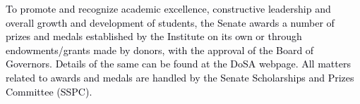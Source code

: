 \documentclass[12pt]{article}
\begin{document}
\vspace{\baselineskip}
\begin{justify}
{\fontsize{9pt}{10.8pt}\selectfont \textcolor[HTML]{00000A}{To promote and recognize academic excellence, constructive leadership and overall growth and development of students, the Senate awards a number of prizes and medals established by the Institute on its own or through endowments/grants made by donors, with the approval of the Board of Governors. Details of the same can be found at the DoSA webpage. All matters related to awards and medals are handled by the Senate Scholarships and Prizes Committee (SSPC).}\par}
\end{justify}\par


\vspace{\baselineskip}

\vspace{\baselineskip}

\vspace{\baselineskip}

\vspace{\baselineskip}

\vspace{\baselineskip}

\vspace{\baselineskip}

\vspace{\baselineskip}

\vspace{\baselineskip}

\vspace{\baselineskip}

\vspace{\baselineskip}

\vspace{\baselineskip}

\vspace{\baselineskip}

\vspace{\baselineskip}

\vspace{\baselineskip}

\vspace{\baselineskip}

\vspace{\baselineskip}

\vspace{\baselineskip}

\vspace{\baselineskip}
\end{document}
